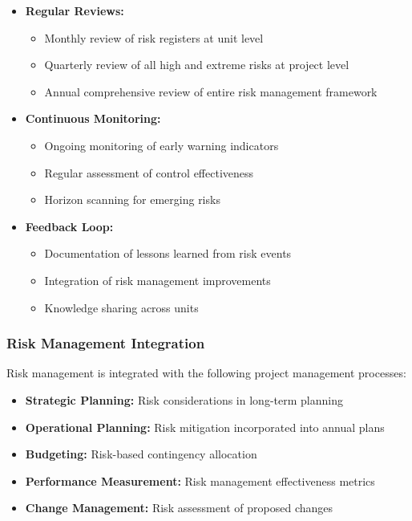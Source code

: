 \begin{itemize}
    \item \textbf{Regular Reviews:}
    \begin{itemize}
        \item Monthly review of risk registers at unit level
        \item Quarterly review of all high and extreme risks at project level
        \item Annual comprehensive review of entire risk management framework
    \end{itemize}
    
    \item \textbf{Continuous Monitoring:}
    \begin{itemize}
        \item Ongoing monitoring of early warning indicators
        \item Regular assessment of control effectiveness
        \item Horizon scanning for emerging risks
    \end{itemize}
    
    \item \textbf{Feedback Loop:}
    \begin{itemize}
        \item Documentation of lessons learned from risk events
        \item Integration of risk management improvements
        \item Knowledge sharing across units
    \end{itemize}
\end{itemize}

\subsubsection{Risk Management Integration} \label{sec:risk_integration}

Risk management is integrated with the following project management processes:

\begin{itemize}
    \item \textbf{Strategic Planning:} Risk considerations in long-term planning
    \item \textbf{Operational Planning:} Risk mitigation incorporated into annual plans
    \item \textbf{Budgeting:} Risk-based contingency allocation
    \item \textbf{Performance Measurement:} Risk management effectiveness metrics
    \item \textbf{Change Management:} Risk assessment of proposed changes
\end{itemize}

